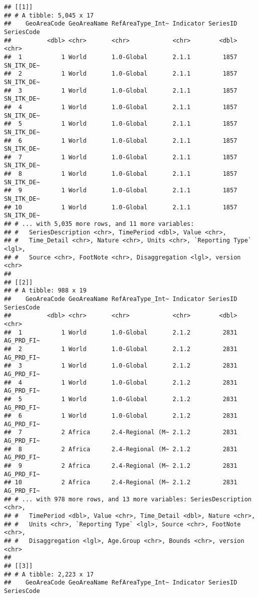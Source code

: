 \documentclass[]{article}
\begin{document}
\begin{verbatim}
## [[1]]
## # A tibble: 5,045 x 17
##    GeoAreaCode GeoAreaName RefAreaType_Int~ Indicator SeriesID SeriesCode
##          <dbl> <chr>       <chr>            <chr>        <dbl> <chr>     
##  1           1 World       1.0-Global       2.1.1         1857 SN_ITK_DE~
##  2           1 World       1.0-Global       2.1.1         1857 SN_ITK_DE~
##  3           1 World       1.0-Global       2.1.1         1857 SN_ITK_DE~
##  4           1 World       1.0-Global       2.1.1         1857 SN_ITK_DE~
##  5           1 World       1.0-Global       2.1.1         1857 SN_ITK_DE~
##  6           1 World       1.0-Global       2.1.1         1857 SN_ITK_DE~
##  7           1 World       1.0-Global       2.1.1         1857 SN_ITK_DE~
##  8           1 World       1.0-Global       2.1.1         1857 SN_ITK_DE~
##  9           1 World       1.0-Global       2.1.1         1857 SN_ITK_DE~
## 10           1 World       1.0-Global       2.1.1         1857 SN_ITK_DE~
## # ... with 5,035 more rows, and 11 more variables:
## #   SeriesDescription <chr>, TimePeriod <dbl>, Value <chr>,
## #   Time_Detail <chr>, Nature <chr>, Units <chr>, `Reporting Type` <lgl>,
## #   Source <chr>, FootNote <chr>, Disaggregation <lgl>, version <chr>
## 
## [[2]]
## # A tibble: 988 x 19
##    GeoAreaCode GeoAreaName RefAreaType_Int~ Indicator SeriesID SeriesCode
##          <dbl> <chr>       <chr>            <chr>        <dbl> <chr>     
##  1           1 World       1.0-Global       2.1.2         2831 AG_PRD_FI~
##  2           1 World       1.0-Global       2.1.2         2831 AG_PRD_FI~
##  3           1 World       1.0-Global       2.1.2         2831 AG_PRD_FI~
##  4           1 World       1.0-Global       2.1.2         2831 AG_PRD_FI~
##  5           1 World       1.0-Global       2.1.2         2831 AG_PRD_FI~
##  6           1 World       1.0-Global       2.1.2         2831 AG_PRD_FI~
##  7           2 Africa      2.4-Regional (M~ 2.1.2         2831 AG_PRD_FI~
##  8           2 Africa      2.4-Regional (M~ 2.1.2         2831 AG_PRD_FI~
##  9           2 Africa      2.4-Regional (M~ 2.1.2         2831 AG_PRD_FI~
## 10           2 Africa      2.4-Regional (M~ 2.1.2         2831 AG_PRD_FI~
## # ... with 978 more rows, and 13 more variables: SeriesDescription <chr>,
## #   TimePeriod <dbl>, Value <chr>, Time_Detail <dbl>, Nature <chr>,
## #   Units <chr>, `Reporting Type` <lgl>, Source <chr>, FootNote <chr>,
## #   Disaggregation <lgl>, Age.Group <chr>, Bounds <chr>, version <chr>
## 
## [[3]]
## # A tibble: 2,223 x 17
##    GeoAreaCode GeoAreaName RefAreaType_Int~ Indicator SeriesID SeriesCode

\end{verbatim}
\end{document}
